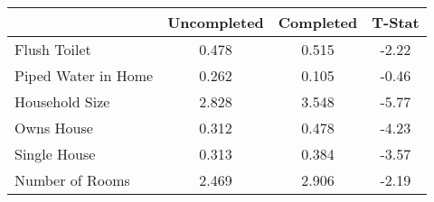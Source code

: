 \begin{tabular}{l*{1}{ccc}}
 &Uncompleted &Completed &T-Stat  \\
\hline 
Flush Toilet &      0.478 &      0.515 &      -2.22  \\
Piped Water in Home &      0.262 &      0.105 &      -0.46  \\
Household Size &      2.828 &      3.548 &      -5.77  \\
Owns House &      0.312 &      0.478 &      -4.23  \\
Single House &      0.313 &      0.384 &      -3.57  \\
Number of Rooms &      2.469 &      2.906 &      -2.19  \\
\hline
\end{tabular}